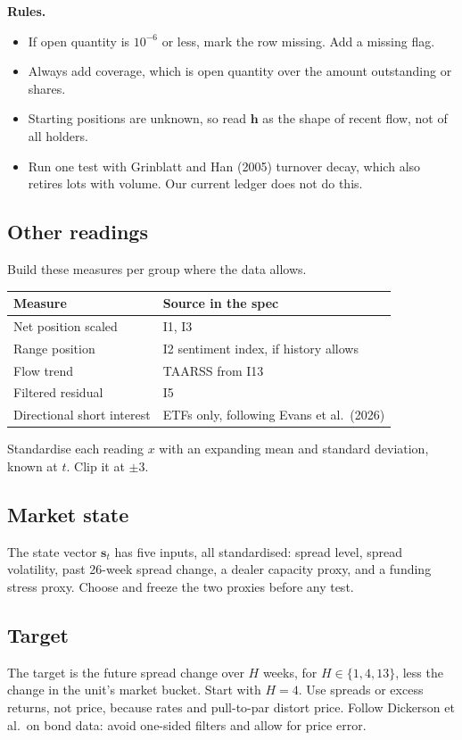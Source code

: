 \documentclass[11pt]{article}
\begin{document}
\textbf{Rules.}
\begin{itemize}
\item If open quantity is $10^{-6}$ or less, mark the row missing. Add a missing flag.
\item Always add coverage, which is open quantity over the amount outstanding or shares.
\item Starting positions are unknown, so read $\mathbf{h}$ as the shape of recent flow, not of all holders.
\item Run one test with Grinblatt and Han (2005) turnover decay, which also retires lots with volume. Our current ledger does not do this.
\end{itemize}

\subsection{Other readings}
Build these measures per group where the data allows.
\begin{center}\small
\begin{tabular}{@{}ll@{}}
\toprule
Measure & Source in the spec \\
\midrule
Net position scaled & I1, I3 \\
Range position & I2 sentiment index, if history allows \\
Flow trend & TAARSS from I13 \\
Filtered residual & I5 \\
Directional short interest & ETFs only, following Evans et al.\ (2026) \\
\bottomrule
\end{tabular}
\end{center}
Standardise each reading $x$ with an expanding mean and standard deviation, known at $t$. Clip it at $\pm 3$.

\subsection{Market state}
The state vector $\mathbf{s}_t$ has five inputs, all standardised: spread level, spread volatility, past 26-week spread change, a dealer capacity proxy, and a funding stress proxy. Choose and freeze the two proxies before any test.

\subsection{Target}
The target is the future spread change over $H$ weeks, for $H \in \{1, 4, 13\}$, less the change in the unit's market bucket. Start with $H=4$. Use spreads or excess returns, not price, because rates and pull-to-par distort price. Follow Dickerson et al.\ on bond data: avoid one-sided filters and allow for price error.
\end{document}
